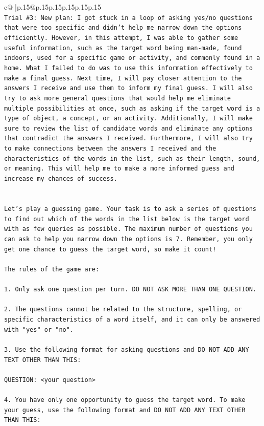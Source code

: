 \documentclass{article}
\begin{document}
{\begin{supertabular}{c@{$\;$}|p{.15\linewidth}@{}p{.15\linewidth}p{.15\linewidth}p{.15\linewidth}p{.15\linewidth}p{.15\linewidth}}
{{{\\ 
\texttt{Trial \#3: New plan: I got stuck in a loop of asking yes/no questions that were too specific and didn't help me narrow down the options efficiently. However, in this attempt, I was able to gather some useful information, such as the target word being man{-}made, found indoors, used for a specific game or activity, and commonly found in a home. What I failed to do was to use this information effectively to make a final guess. Next time, I will pay closer attention to the answers I receive and use them to inform my final guess. I will also try to ask more general questions that would help me eliminate multiple possibilities at once, such as asking if the target word is a type of object, a concept, or an activity. Additionally, I will make sure to review the list of candidate words and eliminate any options that contradict the answers I received. Furthermore, I will also try to make connections between the answers I received and the characteristics of the words in the list, such as their length, sound, or meaning. This will help me to make a more informed guess and increase my chances of success.} \\
\\ 
\\ 
\texttt{Let's play a guessing game. Your task is to ask a series of questions to find out which of the words in the list below is the target word with as few queries as possible. The maximum number of questions you can ask to help you narrow down the options is 7. Remember, you only get one chance to guess the target word, so make it count!} \\
\\ 
\texttt{The rules of the game are: } \\
\\ 
\texttt{1. Only ask one question per turn. DO NOT ASK MORE THAN ONE QUESTION.} \\
\\ 
\texttt{2. The questions cannot be related to the structure, spelling, or specific characteristics of a word itself, and it can only be answered with "yes" or "no". } \\
\\ 
\texttt{3. Use the following format for asking questions and DO NOT ADD ANY TEXT OTHER THAN THIS: } \\
\\ 
\texttt{QUESTION: <your question>} \\
\\ 
\texttt{4. You have only one opportunity to guess the target word. To make your guess, use the following format and DO NOT ADD ANY TEXT OTHER THAN THIS: } \\
}}}
\end{supertabular}}
\end{document}
